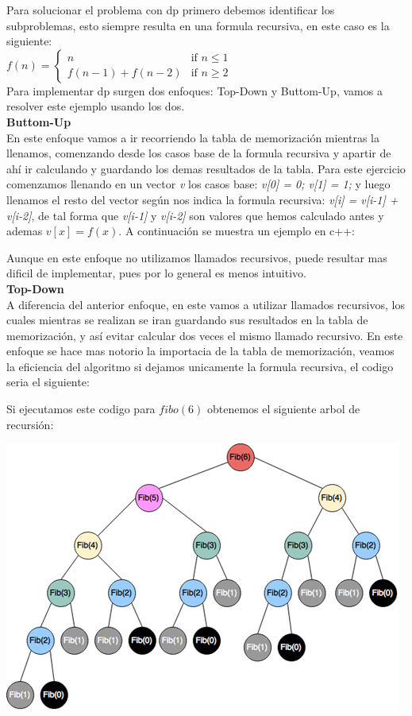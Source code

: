 \documentclass[12pt, a4paper]{article}
\newcommand\cppfile[2][]{

}
\begin{document}
	 Para solucionar el problema con dp primero debemos identificar
	los subproblemas, esto siempre resulta en una formula recursiva, en este caso es la siguiente:\\
	$f(n) = 	
		\begin{cases}
			n & \text{if $n\le 1$}\\
			f(n-1) + f(n-2) & \text{if $n\ge 2$}
	\end{cases}	$\\
	
	Para implementar dp surgen dos enfoques: Top-Down y Buttom-Up, vamos a resolver este ejemplo usando los dos.\\
	
	\textbf{Buttom-Up}\\
	En este enfoque vamos a ir recorriendo la tabla de memorización mientras la llenamos, comenzando desde los
	casos base de la formula recursiva y apartir de ahí ir calculando y guardando los demas resultados de la
	tabla. Para este ejercicio comenzamos llenando en un vector \textit{v} los casos
	base: \textit{v[0] = 0; v[1] = 1;} y luego llenamos el resto del vector según nos indica la formula
	recursiva: \textit{v[i] = v[i-1] + v[i-2]}, de tal forma que \textit{v[i-1]} y \textit{v[i-2]} son valores
	que hemos calculado antes y ademas $v[x] = f(x)$. A continuación se muestra un ejemplo en c++:
	\cppfile[5-12]{codigos/fibo.cpp}
	Aunque en este enfoque no utilizamos llamados recursivos, puede resultar mas dificil de implementar,
	pues por lo general es menos intuitivo.\\
	
	\textbf{Top-Down}\\
	A diferencia del anterior enfoque, en este vamos a utilizar llamados recursivos, los cuales mientras se
	realizan se iran guardando sus resultados en la tabla de memorización, y así evitar calcular dos veces el
	mismo llamado recursivo. En este enfoque se hace mas notorio la importacia de la tabla de memorización, 
	veamos la eficiencia del algoritmo si dejamos unicamente la formula recursiva, el codigo seria el siguiente:
	\cppfile[14-20]{codigos/fibo.cpp}
	Si ejecutamos este codigo para $fibo(6)$ obtenemos el siguiente arbol de recursión:\\
	\begin{center}
		\includegraphics[scale=0.92]{imagenes/arbol_recursion}
	\end{center}
	
\end{document}

